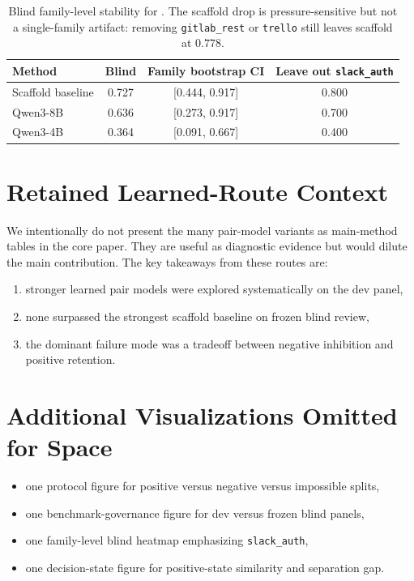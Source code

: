 \begin{table}[h]
    \centering
    \small
    \begin{tabular}{lccc}
        \toprule
        Method & Blind \NOS{} & Family bootstrap CI & Leave out \texttt{slack\_auth} \\
        \midrule
        Scaffold baseline & 0.727 & [0.444, 0.917] & 0.800 \\
        Qwen3-8B & 0.636 & [0.273, 0.917] & 0.700 \\
        Qwen3-4B & 0.364 & [0.091, 0.667] & 0.400 \\
        \bottomrule
    \end{tabular}
    \caption{Blind family-level stability for \NOS{}. The scaffold drop is pressure-sensitive but not a single-family artifact: removing \texttt{gitlab\_rest} or \texttt{trello} still leaves scaffold \NOS{} at $0.778$.}
    \label{tab:appendix-stability}
\end{table}

\section{Retained Learned-Route Context}

We intentionally do not present the many pair-model variants as main-method tables in the core paper. They are useful as diagnostic evidence but would dilute the main contribution. The key takeaways from these routes are:
\begin{enumerate}[leftmargin=1.5em]
    \item stronger learned pair models were explored systematically on the dev panel,
    \item none surpassed the strongest scaffold baseline on frozen blind review,
    \item the dominant failure mode was a tradeoff between negative inhibition and positive retention.
\end{enumerate}

\section{Additional Visualizations Omitted for Space}

\begin{itemize}[leftmargin=1.5em]
    \item one protocol figure for positive versus negative versus impossible splits,
    \item one benchmark-governance figure for dev versus frozen blind panels,
    \item one family-level blind heatmap emphasizing \texttt{slack\_auth},
    \item one decision-state figure for positive-state similarity and separation gap.
\end{itemize}
